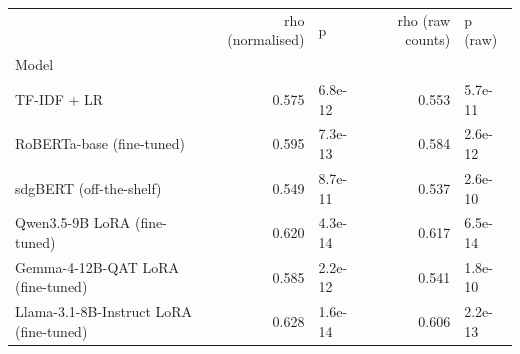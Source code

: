 \begin{tabular}{lrlrl}
\toprule
 & rho (normalised) & p & rho (raw counts) & p (raw) \\
Model &  &  &  &  \\
\midrule
TF-IDF + LR & 0.575 & 6.8e-12 & 0.553 & 5.7e-11 \\
RoBERTa-base (fine-tuned) & 0.595 & 7.3e-13 & 0.584 & 2.6e-12 \\
sdgBERT (off-the-shelf) & 0.549 & 8.7e-11 & 0.537 & 2.6e-10 \\
Qwen3.5-9B LoRA (fine-tuned) & 0.620 & 4.3e-14 & 0.617 & 6.5e-14 \\
Gemma-4-12B-QAT LoRA (fine-tuned) & 0.585 & 2.2e-12 & 0.541 & 1.8e-10 \\
Llama-3.1-8B-Instruct LoRA (fine-tuned) & 0.628 & 1.6e-14 & 0.606 & 2.2e-13 \\
\bottomrule
\end{tabular}
